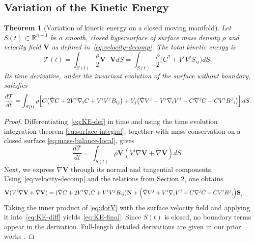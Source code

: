 \documentclass[11pt]{article}
\newcommand{\bS}{\mathbf{S}}
\newcommand{\bN}{\mathbf{N}}
\newcommand{\bV}{\mathbf{V}}
\theoremstyle{definition}
\theoremstyle{plain}
\newtheorem{theorem}[definition]{Theorem}
\theoremstyle{remark}
\begin{document}


\subsection{Variation of the Kinetic Energy}\label{subsec:KE}

\begin{theorem}[Variation of kinetic energy on a closed moving manifold]\label{thm:KE-variation}
Let $S(t)\subset\mathbb{R}^{n+1}$ be a smooth, closed hypersurface of surface mass density $\rho$ and velocity field 
$\bV$ as defined in~\eqref{eq:velocity-decomp}.  
The total kinetic energy is
\begin{equation}\label{eq:KE-def}
\mathcal{T}(t)=\int_{S(t)} \frac{\rho}{2} \bV \cdot \bV dS
=\int_{S(t)} \frac{\rho}{2}\bigl(C^2+V^iV^jS_{ij}\bigr) dS.
\end{equation}
Its time derivative, under the invariant evolution of the surface without boundary, satisfies
\begin{equation}\label{eq:KE-final}
\frac{d\mathcal{T}}{dt}
=\int_{S(t)}\rho
\Bigl[
C\bigl(\dot{\nabla}C+2V^i\nabla_i C+V^iV^jB_{ij}\bigr)
+V_j\bigl(\dot{\nabla}V^j+V^i\nabla_iV^j-C\nabla^jC-CV^iB^j{}_i\bigr)
\Bigr]\,dS.
\end{equation}
\end{theorem}

\begin{proof}
Differentiating~\eqref{eq:KE-def} in time and using the time evolution integration theorem \eqref{eq:surface-integral},
together with mass conservation on a closed surface \eqref{eq:mass-balance-local}, gives
\begin{equation}\label{eq:KE-diff}
\frac{d\mathcal{T}}{dt}
=\int_{S(t)}\rho \bV(V^i\nabla\bV+\dot\nabla\bV) dS.
\end{equation}
Next, we express $\dot{\nabla}\bV$ through its normal and tangential components.  
Using~\eqref{eq:velocity-decomp} and the relations from Section 2,
one obtains
\begin{align}\label{eq:dotV}
\bV(V^i\nabla\bV+\dot\nabla\bV)
&=(\dot{\nabla}C+2V^i\nabla_iC+V^iV^jB_{ij})\bN
+\Bigl(\dot{\nabla}V^j+V^i\nabla_iV^j
       -C \nabla^jC-C V^iB^j{}_i\Bigr)\bS_j.
\end{align}
Taking the inner product of \eqref{eq:dotV} with the surface velocity field and applying it into~\eqref{eq:KE-diff} yields~\eqref{eq:KE-final}.
Since $S(t)$ is closed, no boundary terms appear in the derivation. Full-length detailed derivations are given in our prior works \cite{Svintradze2017, Svintradze2018}.  
\end{proof}
\end{document}
